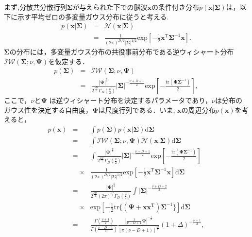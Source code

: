 \documentclass[journal]{IEEEtran}
\begin{document}
まず,分散共分散行列$\bm \Sigma$が与えられた下での脳波$\mathbf{x}$の条件付き分布$p(\mathbf{x}|\mathbf{\Sigma})$は，以下に示す平均ゼロの多変量ガウス分布に従うと考える.
%
\begin{eqnarray}
	p(\mathbf{x}|{\bm \Sigma}) &=& {\mathcal N}(\mathbf{x}|{\bm \Sigma}) \nonumber\\
&=& \frac{1}{(2\pi)^{D/2} |\mathbf{\Sigma}|^{1/2}} \mathrm{exp} \left[-\frac{1}{2}\mathbf{x}^\mathrm{T} {\bm \Sigma}^{-1} \mathbf{x}\right]. \label{eq:gauss_x}
\label{eq:p_x_sigma} %
\end{eqnarray}
%
$\mathbf{\Sigma}$の分布には，多変量ガウス分布の共役事前分布である逆ウィシャート分布${\mathcal {IW}}({\bm \Sigma}; \nu, {\bm \Psi})$を仮定する．
%
\begin{eqnarray}
	p({\bm \Sigma}) &=& {\mathcal {IW}}({\bm \Sigma};\nu,{\bm \Psi}) \nonumber\\
&=& \frac{|{\bm \Psi}|^{\frac{\nu}{2}}}{2^{\frac{\nu D}{2}} \Gamma_D \left(\frac{\nu}{2}\right)} |\bm \Sigma|^{-\frac{\nu+D+1}{2}} \mathrm{exp} \left[-\frac{\mathrm{tr}(\bm \Psi \bm \Sigma^{-1})}{2}\right],\label{eq:p_sigma} %
\end{eqnarray}
%
ここで，$\nu$と${\bm \Psi}$ は逆ウィシャート分布を決定するパラメータであり，$\nu$は分布のガウス性を決定する自由度，${\bm \Psi}$は尺度行列である．いま, $\mathbf{x}$の周辺分布$p(\mathbf{x})$を考えると，
\begin{eqnarray}
	p(\mathbf{x}) &=& \int p({\bm \Sigma})p(\mathbf{x}|{\bm \Sigma}) \mathrm{d}{\bm \Sigma} \nonumber \\
		&=& \int {\mathcal {IW}}({\bm \Sigma}; \nu, {\bm \Psi}) {\mathcal N}(\mathbf{x}|{\bm \Sigma}) \mathrm{d}{\bm \Sigma} \label{eq:marginal_x} \\ %
		&=& \int \frac{|{\bm \Psi}|^{\frac{\nu}{2}}}{2^{\frac{\nu D}{2}} \Gamma_D \left(\frac{\nu}{2}\right)} |\mathbf{\Sigma}|^{-\frac{\nu+D+1}{2}}\mathrm{exp} \left[-\frac{\mathrm{tr}(\bm \Psi \bm \Sigma^{-1})}{2}\right] \nonumber \\
&\quad \times&\frac{1}{(2\pi)^{D/2} |\mathbf{\Sigma}|^{1/2}} \mathrm{exp} \left[-\frac{1}{2}\mathbf{x}^\mathrm{T} {\bm \Sigma}^{-1} \mathbf{x}\right] \mathrm{d}{\bm \Sigma} \nonumber \\
		&=& \frac{|{\bm \Psi}|^{\frac{\nu}{2}}}{2^{\frac{\nu D}{2}} (2\pi)^\frac{D}{2} \Gamma_D \left(\frac{\nu}{2}\right)} \int |\mathbf{\Sigma}|^{-\frac{\nu+D+2}{2}}\nonumber\\
&\quad \times&\mathrm{exp} \left[-\frac{1}{2}\mathrm{tr}\{(\bm \Psi + \mathbf{x} \mathbf{x}^\mathrm{T})\bm \Sigma^{-1}\}\right] \mathrm{d}{\bm \Sigma} \nonumber \\
\label{eq:p_x}
&=& \frac{\Gamma(\frac{\nu+1}{2})}{\Gamma(\frac{\nu-D+1}{2})} \frac{|\frac{1}{\nu-D+1} {\bm \Psi}|^{-\frac{1}{2}}}{\left[\pi(\nu-D+1) \right]^{\frac{D}{2}}} (1+\Delta)^{-\frac{\nu+1}{2}} ,%
\end{eqnarray}
\end{document}
